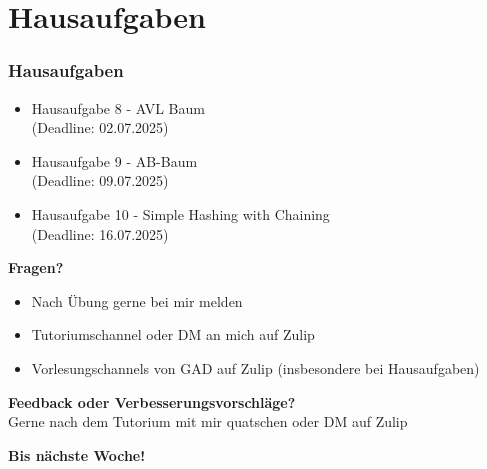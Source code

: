\documentclass{beamer}
\begin{document}
\section{Hausaufgaben}
\begin{frame}
  \frametitle{Hausaufgaben}
  \begin{itemize}
    \item Hausaufgabe 8 - AVL Baum \\
          (Deadline: 02.07.2025)
    \item Hausaufgabe 9 - AB-Baum \\
          (Deadline: 09.07.2025)
    \item Hausaufgabe 10 - Simple Hashing with Chaining \\
          (Deadline: 16.07.2025)
  \end{itemize}
\end{frame}

\begin{frame}
  \textbf{Fragen?}
  \begin{itemize}
    \item Nach Übung gerne bei mir melden
    \item Tutoriumschannel oder DM an mich auf Zulip
    \item Vorlesungschannels von GAD auf Zulip (insbesondere bei Hausaufgaben)
  \end{itemize}

  \medskip
  \textbf{Feedback oder Verbesserungsvorschläge?} \\
  Gerne nach dem Tutorium mit mir quatschen oder DM auf Zulip

  \medskip
  \textbf{Bis nächste Woche!}
\end{frame}

\end{document}
